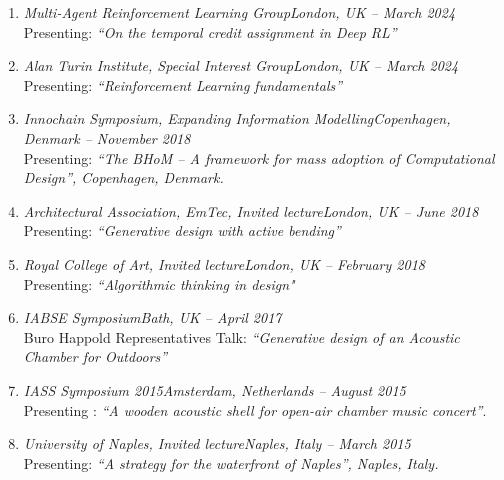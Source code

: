 \begin{presentations}
    \begin{enumerate}[leftmargin=0.45cm, itemsep=0em, topsep=0.5em, parsep=0.2em]
        \item
        \emph{Multi-Agent Reinforcement Learning Group}\hfill \textit{London, UK -- March 2024} \\
            Presenting: \textit{``On the temporal credit assignment in Deep RL''}
        \item
        \emph{Alan Turin Institute, Special Interest Group}\hfill \textit{London, UK -- March 2024} \\
            Presenting: \textit{“Reinforcement Learning fundamentals”}
        \item
        \emph{Innochain Symposium, Expanding Information Modelling}\hfill            \textit{Copenhagen, Denmark -- November 2018} \\
            Presenting: \textit{“The BHoM – A framework for mass adoption of Computational Design”, Copenhagen, Denmark.}

        \item \emph{Architectural Association, EmTec, Invited lecture}\hfill             \textit{London, UK -- June 2018} \\
            Presenting: \textit{“Generative design with active bending”}

        \item \emph{Royal College of Art, Invited lecture}\hfill \textit{London, UK -- February 2018} \\
            Presenting: \textit{“Algorithmic thinking in design"}

        \item \emph{IABSE Symposium}\hfill \textit{Bath, UK -- April 2017} \\
            Buro Happold Representatives Talk: \textit{“Generative design of an Acoustic Chamber for Outdoors”}

        \item \emph{IASS Symposium 2015}\hfill \textit{Amsterdam, Netherlands -- August 2015} \\
        Presenting : \textit{“A wooden acoustic shell for open-air chamber music concert”}.

        \item \emph{University of Naples, Invited lecture}\hfill \textit{Naples, Italy -- March 2015} \\
    	Presenting: \textit{“A strategy for the waterfront of Naples”, Naples, Italy.}

    \end{enumerate}
\end{presentations}
